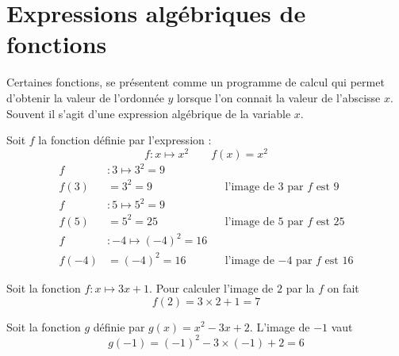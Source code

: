 \documentclass[main.tex]{subfiles}
\begin{document}
\section{Expressions algébriques de fonctions}
Certaines fonctions, se présentent comme un programme de calcul qui permet d'obtenir la valeur de l'ordonnée $y$ lorsque l'on connait la valeur de l'abscisse $x$. Souvent il s'agit d'une expression algébrique de la variable $x$. 
\begin{example}Soit $f$ la fonction définie par l'expression  :
	$$f\colon x\mapsto x^2\qquad f(x)=x^2$$ 
	\begin{align*}
		f&\colon 3 \mapsto 3^2 =9 \\
		f(3)& = 3^2=9 && \text{l'image de $3$ par $f$ est $9$}\\ 
		f&\colon 5 \mapsto 5^2 =9 \\
		f(5)& = 5^2=25 && \text{l'image de $5$ par $f$ est $25$}\\ 
		f&\colon -4 \mapsto (-4)^2 =16 \\
		f(-4)& = (-4)^2=16 && \text{l'image de $-4$ par $f$ est $16$} 
	\end{align*}
\end{example}
\begin{example} Soit la fonction $f : x\mapsto 3x+1 $. Pour calculer l'image de $2$ par la  $f$ on fait $$f(2)=3\times 2 +1=7$$  
\end{example}
\begin{example}
	Soit la fonction $g$ définie par $g(x)=x^2-3x+2$. 
	L'image de $-1$ vaut 
	$$g(-1)=(-1)^2-3\times(-1)+2 =6$$
\end{example}
 

\newpage 
{}  
\pagestyle{scrheadings} %
\onehalfspacing
\end{document}
